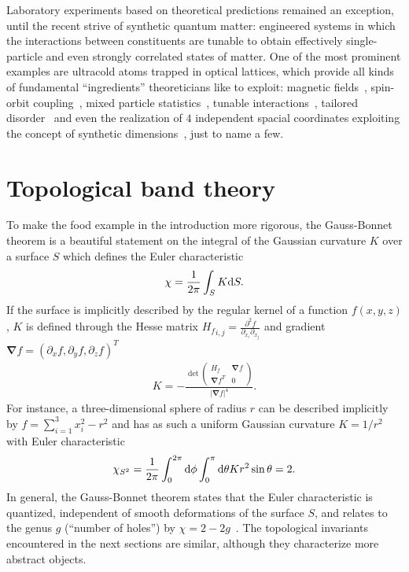 Laboratory experiments based on theoretical predictions remained an exception, until the recent strive of synthetic quantum matter:
engineered systems in which the interactions between constituents are tunable to obtain effectively single-particle and even strongly correlated states of matter.
One of the most prominent examples are ultracold atoms trapped in optical lattices, which provide all kinds of fundamental ``ingredients'' theoreticians like to exploit: magnetic fields~\cite{Lin2009}, spin-orbit coupling~\cite{Lin2011}, mixed particle statistics~\cite{Ferrari2002}, tunable interactions~\cite{Chin2010}, tailored disorder~\cite{Meier2018} and even the realization of $4$ independent spacial coordinates exploiting the concept of synthetic dimensions~\cite{Lohse2018}, just to name a few.
%
%
\section{Topological band theory}
\label{sec:topological_band_theory}
%
%
To make the food example in the introduction more rigorous, the Gauss-Bonnet theorem is a beautiful statement on the integral of the Gaussian curvature $K$ over a surface $S$ which defines the Euler characteristic~\cite{Nakahara1990}
\begin{align}
    \chi = \frac1{2\pi}\int_S K\mathrm d S.
    \label{eq:gauss_bonnet_theorem}
\end{align}
If the surface is implicitly described by the regular kernel of a function $f(x,y,z)$, $K$ is defined through the Hesse matrix ${H_f}_{i,j}=\frac{\partial^2 f}{\partial_{x_i}\partial_{x_j}}$ and gradient $\bm\nabla f = (\partial_{x}f,\partial_{y}f,\partial_{z}f)^T$~\cite{Goldman2005}
\begin{align}
    K = -\frac{
    \det
    \begin{pmatrix}
        H_f & \bm\nabla f \\
        \bm\nabla f^T & 0
    \end{pmatrix}
    }{|\bm\nabla f|^4}
    .
\end{align}
For instance, a three-dimensional sphere of radius $r$ can be described implicitly by $f=\sum_{i=1}^3 x_i^2 - r^2$ and has as such a uniform Gaussian curvature $K=1/r^2$ with Euler characteristic
\begin{align}
    \chi_{S^2} = \frac1{2\pi}\int_0^{2\pi}\mathrm d\phi \int_0^\pi\mathrm d\theta K r^2\sin\theta = 2.
\end{align}
In general, the Gauss-Bonnet theorem states that the Euler characteristic is quantized, independent of smooth deformations of the surface $S$, and relates to the genus $g$ (``number of holes'') by $\chi=2-2g$~\cite{Nakahara1990}.
The topological invariants encountered in the next sections are similar, although they characterize more abstract objects.

